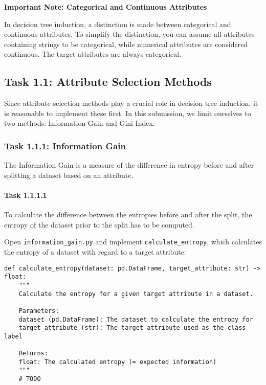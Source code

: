 \documentclass[
english,
smallborders
]{i6prcsht}
\begin{document}
\vspace*{1mm}

\begin{mdframed}
	\begin{em}
		\textbf{Important Note: Categorical and Continuous Attributes}

		In decision tree induction, a distinction is made between categorical and continuous attributes. To simplify the distinction, you can assume all attributes containing strings to be categorical, while numerical attributes are considered continuous. The target attributes are always categorical.
	\end{em}
\end{mdframed}

\subsection*{Task 1.1: Attribute Selection Methods}

Since attribute selection methods play a crucial role in decision tree induction, it is reasonable to implement these first. In this submission, we limit ourselves to two methods: Information Gain and Gini Index.

\subsubsection*{Task 1.1.1: Information Gain}

The Information Gain is a measure of the difference in entropy before and after splitting a dataset based on an attribute.

\paragraph*{Task 1.1.1.1} \hfill

To calculate the difference between the entropies before and after the split, the entropy of the dataset prior to the split has to be computed.

Open \texttt{information\_gain.py} and implement \texttt{calculate\_entropy}, which calculates the entropy of a dataset with regard to a target attribute:

\vspace*{0.3cm}

\begin{lstlisting}
def calculate_entropy(dataset: pd.DataFrame, target_attribute: str) -> float:
	"""
	Calculate the entropy for a given target attribute in a dataset.

	Parameters:
	dataset (pd.DataFrame): The dataset to calculate the entropy for
	target_attribute (str): The target attribute used as the class label

	Returns:
	float: The calculated entropy (= expected information)
	"""
	# TODO
\end{lstlisting}
\end{document}

